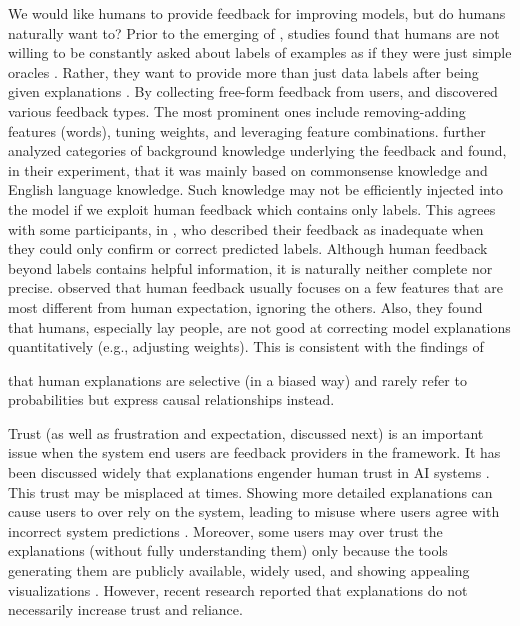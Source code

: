 We would like humans to provide feedback for improving models, but do humans naturally want to?
Prior to the emerging of \EBHD, studies found that humans are not willing to be constantly asked about labels of examples as if they were just simple oracles .
Rather, they want to provide more than just data labels after being given explanations .
By collecting free-form feedback from users,  and 
discovered various feedback types. The most prominent ones include removing-adding features (words), tuning weights, and leveraging feature combinations.
 further analyzed categories of background knowledge underlying the feedback and found, in their experiment, that it was mainly based on commonsense knowledge and English language knowledge. 
Such knowledge may not be efficiently injected into the model if we exploit human feedback which contains only labels.
This agrees with some participants, in , who described their feedback as inadequate when they could only confirm or correct predicted labels.
Although human feedback beyond labels contains helpful information, it is naturally neither complete nor precise. 
observed that human feedback usually focuses on a few features that are most different from human expectation, ignoring the others.
Also, they found that humans, especially lay people, are not good at correcting model
explanations quantitatively (e.g., adjusting weights). 
This is consistent with the findings of

that human explanations are selective (in a biased 
way) and rarely refer to probabilities but express causal relationships instead.

Trust (as well as frustration and expectation, discussed next) is an important issue when the system end users are feedback providers in the \EBHD framework.
It has been discussed widely that explanations engender human trust in AI systems .
This trust may be misplaced at times. 
Showing more detailed explanations can cause users to over rely on the system, leading to misuse where users agree with incorrect system predictions .
Moreover, some users may over trust the explanations (without fully understanding them) only because the tools generating them are publicly available, widely used, and showing appealing visualizations 
.
However, recent research reported that explanations do not necessarily increase trust and reliance.

